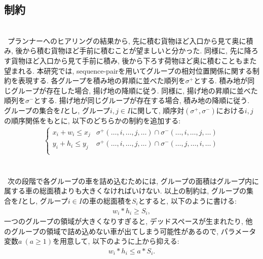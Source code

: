\subsection{制約}
\\
\ プランナーへのヒアリングの結果から, 先に積む貨物ほど入口から見て奥に積み, 後から積む貨物ほど手前に積むことが望ましいと分かった. 
同様に, 先に降ろす貨物ほど入口から見て手前に積み, 後から下ろす荷物ほど奥に積むこともまた望まれる. 
本研究では, sequence-pairを用いてグループの相対位置関係に関する制約を表現する. 
各グループを積み地の昇順に並べた順列を$\sigma^+$とする. 
積み地が同じグループが存在した場合, 揚げ地の降順に従う. 
同様に, 揚げ地の昇順に並べた順列を$\sigma^-$とする. 
揚げ地が同じグループが存在する場合, 積み地の降順に従う. \\
グループの集合を$I$とし, グループ$i,j \in I$に関して, 順序対$(\sigma^+,\sigma^-)$における$i,j$の順序関係をもとに, 以下のどちらかの制約を追加する: \\
\begin{eqnarray}
    \left\{
        \begin{array}{ll}
            x_i + w_i \leq x_j & \sigma^+(\ldots,i,\ldots,j,\ldots) \cap \sigma^-(\ldots,i,\ldots,j,\ldots) \\
            y_i + h_i \leq y_j & \sigma^+(\ldots,i,\ldots,j,\ldots) \cap \sigma^-(\ldots,j,\ldots,i,\ldots) \\
        \end{array}
    \right.
\end{eqnarray}\\


\\
\ 次の段階で各グループの車を詰め込むためには, グループの面積はグループ内に属する車の総面積よりも大きくなければいけない. 
以上の制約は, グループの集合を$I$とし, グループ$i \in I$の車の総面積を$S_i$とすると, 以下のように書ける: \\
\begin{eqnarray}
    w_i*h_i \geq S_i , 
\end{eqnarray}
一つのグループの領域が大きくなりすぎると, デッドスペースが生まれたり, 他のグループの領域で詰め込めない車が出てしまう可能性があるので, パラメータ変数$a\ (a \geq 1)$を用意して, 以下のように上から抑える:  
\begin{eqnarray}
    w_i*h_i \leq a*S_i.
    \label{a_const}
\end{eqnarray}\\

